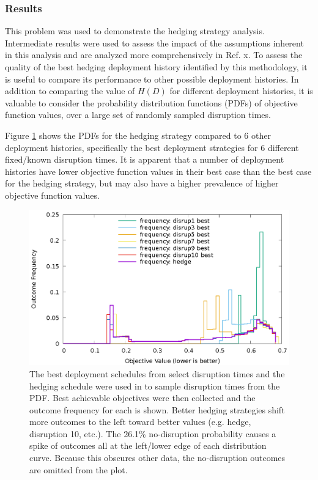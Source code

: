 \subsubsection{Results}

This problem was used to demonstrate the hedging strategy analysis.
Intermediate results were used to assess the impact of the assumptions
inherent in this analysis and are analyzed more comprehensively in
Ref. x.  To assess the quality of the best hedging
deployment history identified by this methodology, it is useful to compare its
performance to other possible deployment histories.  In addition to comparing
the value of $H(D)$ for different deployment histories, it is valuable to
consider the probability distribution functions (PDFs) of objective function
values, over a large set of randomly sampled disruption times.


Figure \ref{fig:exp3-outcome-dists} shows the PDFs for the hedging strategy
compared to 6 other deployment histories, specifically the best deployment
strategies for 6 different fixed/known disruption times.  It is apparent that
a number of deployment histories have lower objective function values in their
best case than the best case for the hedging strategy, but may also have a
higher prevalence of higher objective function values.

\begin{figure}[!htb]
    \centering
    \includegraphics[width=1.0\columnwidth]{dists.eps}
    \caption[Outcome Distributions in Hedging Analysis]{
        The best deployment schedules from select disruption times and the
        hedging schedule were used in to sample disruption times from the PDF.
        Best achievable objectives were then collected and the outcome
        frequency for each is shown.  Better hedging strategies shift more
        outcomes to the left toward better values (e.g. hedge, disruption 10,
        etc.).  The 26.1\% no-disruption probability causes a spike of
        outcomes all at the left/lower edge of each distribution curve.
        Because this obscures other data, the no-disruption outcomes are
        omitted from the plot.
    }
    \label{fig:exp3-outcome-dists}
\end{figure}


